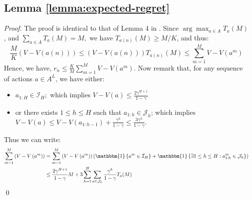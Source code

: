 \documentclass[runningheads]{llncs}
\newcommand{\citep}{\cite}
\begin{document}
\subsection{Lemma \ref{lemma:expected-regret}}
\begin{proof}
The proof is identical to that of Lemma 4 in \citep{Bubeck2010}.
Since $\arg \max _{a \in A} T_{a}(M)$, and $\sum_{a \in A} T_{a}(M)=M,$ we have $T_{a(n)}(M) \geq M / K$, and thus:
\begin{equation*}
\frac{M}{K}(V-V(a(n))) \leq(V-V(a(n))) T_{a(n)}(M) \leq \sum_{m=1}^{M} V-V\left(a^{m}\right)
\end{equation*}
Hence, we have, $r_{n} \leq \frac{K}{M} \sum_{m=1}^{M} V-V\left(a^{m}\right)$. Now remark that, for any sequence of actions $a\in A^L$, we have either:
\begin{itemize}
    \item $a_{1 : H} \in \mathcal{I}_{H} ;$ which implies $V-V(a) \leq \frac{2 \gamma^{H+1}}{1-\gamma}$
    \item or there exists $1\leq h \leq H$ such that $a_{1:h} \in \mathcal{J}_h$; which implies $V-V(a) \leq V-V\left(a_{1 : h-1}\right)+\frac{\gamma^{h}}{1-\gamma} \leq \frac{3 \gamma^{h}}{1-\gamma}$.
\end{itemize}
Thus we can write:
\begin{equation*}
\begin{aligned} \sum_{m=1}^{M}\left(V-V\left(a^{m}\right)\right) &=\sum_{m=1}^{M}\left(V-V\left(a^{m}\right)\right)\left(\mathbbm{1}\left\{a^{m} \in \mathcal{I}_{H}\right\}+\mathbbm{1}\left\{\exists 1 \leq h \leq H : a_{1 : h}^{m} \in \mathcal{J}_{h}\right\}\right) \\ & \leq \frac{2 \gamma^{H+1}}{1-\gamma} M+3 \sum_{h=1}^{H} \sum_{a \in \mathcal{J}_{h}} \frac{\gamma^{h}}{1-\gamma} T_{a}(M) \end{aligned}
\end{equation*}
\qed
\end{proof}
\end{document}
